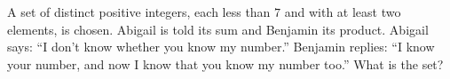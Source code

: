 A set of distinct positive integers, each less than $7$ and with at least two elements, is chosen. Abigail is told its sum and Benjamin its product. Abigail says: ``I don't know whether you know my number.'' Benjamin replies: ``I know your number, and now I know that you know my number too.'' What is the set?
